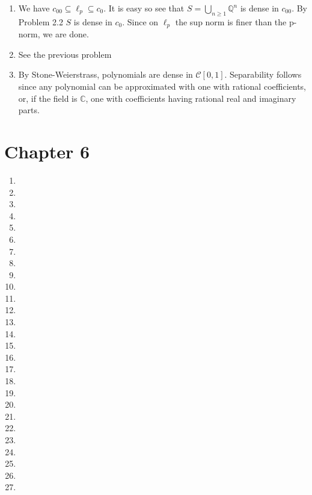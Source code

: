 \documentclass{article}
\begin{document}
\begin{enumerate}
    \begin{proof}
        Suppose $v_n \in B_V$. By Theorem 5.4.2 $v_{n_k} \rightharpoonup v$. By Schur's lemma $v_{n_k} \to v$. Since $B_V$ is closed $v \in B_V$. We have shown sequential compactness.
    \end{proof}

    By Proposition 2.3.6 $V$ is finite dimensional
    
    \item We have $c_{00} \subseteq \ell_p \subseteq c_0$. It is easy so see that $S=\bigcup_{n \geq 1}\mathbb{Q}^n$ is dense in $c_{00}$. By Problem 2.2 $S$ is dense in $c_0$. Since on $\ell_p$ the sup norm is finer than the p-norm, we are done.
    
    \item See the previous problem
    
    \item By Stone-Weierstrass, polynomials are dense in $\mathcal{C}[0,1]$. Separability follows since any polynomial can be approximated with one with rational coefficients, or, if the field is $\mathbb{C}$, one with coefficients having rational real and imaginary parts.

\end{enumerate}


\section*{Chapter 6}

\begin{enumerate}
    \item 
    \item
    \item
    \item
    \item
    \item
    \item
    \item
    \item
    \item
    \item
    \item
    \item
    \item
    \item
    \item
    \item
    \item
    \item
    \item
    \item
    \item
    \item
    \item
    \item
    \item
    \item
\end{enumerate}
\end{document}
